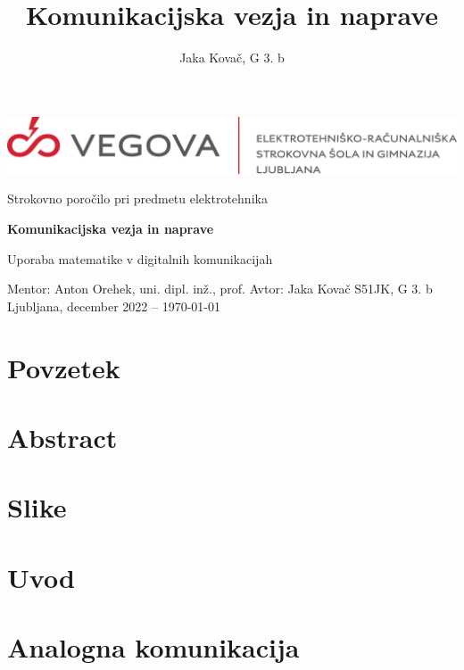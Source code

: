 \documentclass[12pt]{article}
\title{Komunikacijska vezja in naprave}
\author{Jaka Kovač, G 3. b}
\begin{document}

\begin{center}
    \thispagestyle{empty}
    \includegraphics[scale=1]{slike/logotip_vegova_leze_brezokvirja.png}
    
    \vspace{\fill} 
    Strokovno poročilo pri predmetu elektrotehnika

    \Huge{\textbf{Komunikacijska vezja in naprave}}

    \normalsize
    Uporaba matematike v digitalnih komunikacijah
    \vspace{\fill}

    Mentor: Anton Orehek, uni. dipl. inž., prof. \hfill Avtor: Jaka Kovač S51JK,
    G 3. b\\
    \null
    Ljubljana, december 2022 – \MMYYYYdate\today
\end{center}
\newpage
\thispagestyle{empty}
\null
\newpage
\thispagestyle{empty}

\section*{Povzetek}
\section*{Abstract}

\newpage
\thispagestyle{empty}
\tableofcontents

\begingroup
\makeatletter
\section*{Slike}
\let\clearpage\relax
\makeatother
\endgroup


\newpage
\section{Uvod}
\newpage
\section{Analogna komunikacija}
\end{document}

